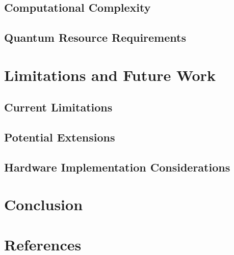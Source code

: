 \documentclass[conference]{IEEEtran}
\begin{document}
\subsection{Computational Complexity}
\subsection{Quantum Resource Requirements}

\section{Limitations and Future Work}
\subsection{Current Limitations}
\subsection{Potential Extensions}
\subsection{Hardware Implementation Considerations}

\section{Conclusion}


\section*{References}
\end{document}

